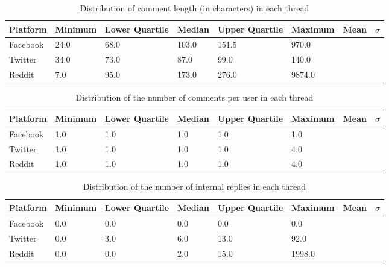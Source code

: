 \begin{table}
\centering
\caption{Distribution of comment length (in characters) in each thread}
\label{table:perception:comment_length}
\begin{tabular}{ l | l | l | l | l | l | l | l}
\textbf{Platform} & \textbf{Minimum} & \textbf{Lower Quartile} & \textbf{Median} & \textbf{Upper Quartile} & \textbf{Maximum} & \textbf{Mean} & \textbf{$\sigma$}\\
\hline
Facebook & 24.0 & 68.0 & 103.0 & 151.5 & 970.0 &  & \\
\hline
Twitter & 34.0 & 73.0 & 87.0 & 99.0 & 140.0 &  & \\
\hline
Reddit &  7.0 & 95.0 & 173.0 & 276.0 & 9874.0 &  & \\
\end{tabular}
\end{table}

\begin{table}
\centering
\caption{Distribution of the number of comments per user in each thread}
\label{table:perception:comments_per_user}
\begin{tabular}{ l | l | l | l | l | l | l | l}
\textbf{Platform} & \textbf{Minimum} & \textbf{Lower Quartile} & \textbf{Median} & \textbf{Upper Quartile} & \textbf{Maximum} & \textbf{Mean} & \textbf{$\sigma$}\\
\hline
Facebook & 1.0 & 1.0 & 1.0 & 1.0 & 1.0 &  & \\
\hline
Twitter & 1.0 & 1.0 & 1.0 & 1.0 & 4.0 &  & \\
\hline
Reddit & 1.0 & 1.0 & 1.0 & 1.0 & 4.0 &  & \\
\end{tabular}
\end{table}

\begin{table}
\centering
\caption{Distribution of the number of internal replies in each thread}
\label{table:perception:replies}
\begin{tabular}{ l | l | l | l | l | l | l | l}
\textbf{Platform} & \textbf{Minimum} & \textbf{Lower Quartile} & \textbf{Median} & \textbf{Upper Quartile} & \textbf{Maximum} & \textbf{Mean} & \textbf{$\sigma$}\\
\hline
Facebook & 0.0 & 0.0 & 0.0 & 0.0 & 0.0 &  & \\
\hline
Twitter & 0.0 & 3.0 & 6.0 & 13.0 & 92.0 &  & \\
\hline
Reddit & 0.0 & 0.0 & 2.0 & 15.0 & 1998.0 &  & \\
\end{tabular}
\end{table}


